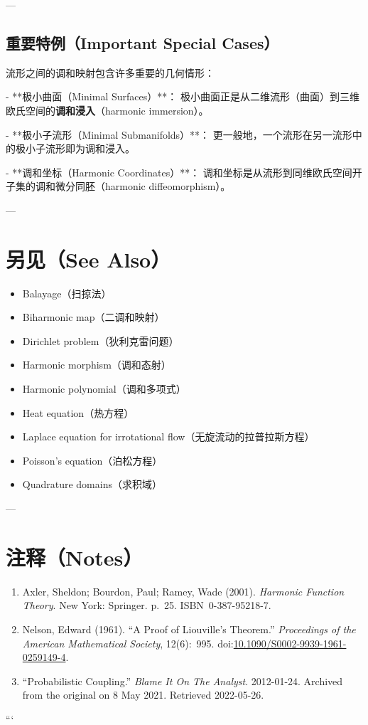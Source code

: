 ---

\subsection*{重要特例（Important Special Cases）}

流形之间的调和映射包含许多重要的几何情形：

- **极小曲面（Minimal Surfaces）**：  
  极小曲面正是从二维流形（曲面）到三维欧氏空间的\textbf{调和浸入}（harmonic immersion）。

- **极小子流形（Minimal Submanifolds）**：  
  更一般地，一个流形在另一流形中的极小子流形即为调和浸入。

- **调和坐标（Harmonic Coordinates）**：  
  调和坐标是从流形到同维欧氏空间开子集的调和微分同胚（harmonic diffeomorphism）。

---

\section*{另见（See Also）}

\begin{itemize}
  \item Balayage（扫掠法）
  \item Biharmonic map（二调和映射）
  \item Dirichlet problem（狄利克雷问题）
  \item Harmonic morphism（调和态射）
  \item Harmonic polynomial（调和多项式）
  \item Heat equation（热方程）
  \item Laplace equation for irrotational flow（无旋流动的拉普拉斯方程）
  \item Poisson's equation（泊松方程）
  \item Quadrature domains（求积域）
\end{itemize}

---

\section*{注释（Notes）}

\begin{enumerate}
  \item Axler, Sheldon; Bourdon, Paul; Ramey, Wade (2001). \emph{Harmonic Function Theory}. New York: Springer. p.~25. ISBN~0-387-95218-7.
  \item Nelson, Edward (1961). “A Proof of Liouville’s Theorem.” \emph{Proceedings of the American Mathematical Society}, 12(6):~995. doi:\href{https://doi.org/10.1090/S0002-9939-1961-0259149-4}{10.1090/S0002-9939-1961-0259149-4}.
  \item “Probabilistic Coupling.” \emph{Blame It On The Analyst}. 2012-01-24. Archived from the original on 8 May 2021. Retrieved 2022-05-26.
\end{enumerate}
```








